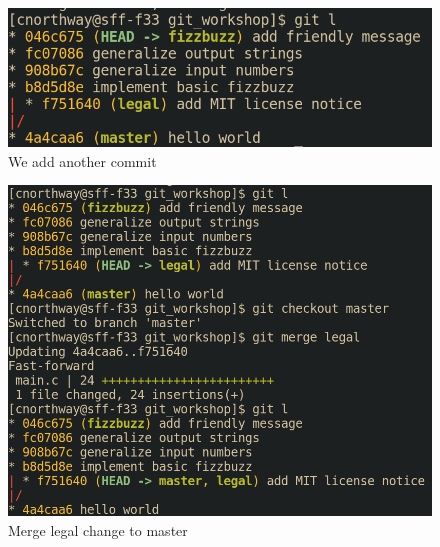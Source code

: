 \documentclass{beamer} \usetheme{Madrid}
\begin{document}
\begin{frame}
    \begin{figure}
        \includegraphics[height=\textwidth-2cm]{ex_imgs/5.png}
        \caption{We add another commit}
    \end{figure}
\end{frame}
\begin{frame}
    \begin{figure}
        \includegraphics[height=\textwidth-2cm]{ex_imgs/6.png}
        \caption{Merge legal change to master}
    \end{figure}
\end{frame}
\end{document}
